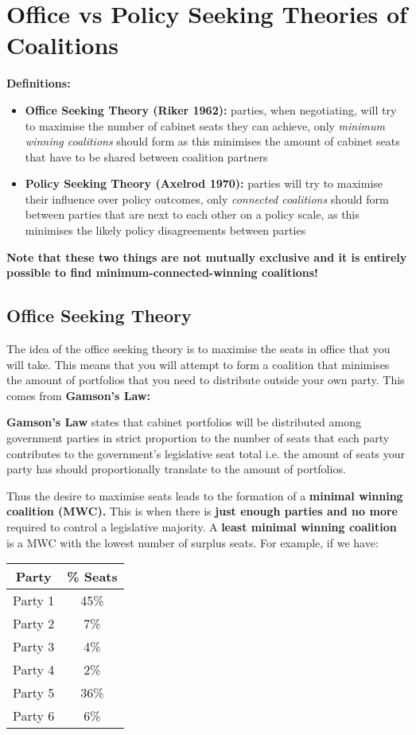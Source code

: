 \documentclass[12pt, letterpaper]{article}
\begin{document}
\section{Office vs Policy Seeking Theories of Coalitions}
\textbf{Definitions:}
\begin{itemize}
	\item \textbf{Office Seeking Theory (Riker 1962):} parties, when negotiating, will try to maximise the number of cabinet seats they can achieve, only \textit{minimum winning coalitions} should form as this minimises the amount of cabinet seats that have to be shared between coalition partners
	\item \textbf{Policy Seeking Theory (Axelrod 1970):} parties will try to maximise their influence over policy outcomes, only \textit{connected coalitions} should form between parties that are next to each other on a policy scale, as this minimises the likely policy disagreements between parties
\end{itemize}
\textbf{Note that these two things are not mutually exclusive and it is entirely possible to find minimum-connected-winning coalitions!}

\subsection{Office Seeking Theory}
The idea of the office seeking theory is to maximise the seats in office that you will take. This means that you will attempt to form a coalition that minimises the amount of portfolios that you need to distribute outside your own party. This comes from \textbf{Gamson's Law:}
\begin{center}
	\textbf{Gamson's Law} states that cabinet portfolios will be distributed among government parties in strict proportion to the number of seats that each party contributes to the government's legislative seat total i.e. the amount of seats your party has should proportionally translate to the amount of portfolios.
\end{center}
Thus the desire to maximise seats leads to the formation of a \textbf{minimal winning coalition (MWC).} This is when there is \textbf{just enough parties and no more} required to control a legislative majority. A \textbf{least minimal winning coalition} is a MWC with the lowest number of surplus seats. For example, if we have:
\begin{center}
\begin{tabular}{|c | c|}

\hline
Party & \% Seats\\
\hline
Party 1 & 45\%\\
\hline
Party 2 & 7\%\\
\hline
Party 3 & 4\%\\
\hline
Party 4 & 2\%\\
\hline
Party 5 & 36\%\\
\hline
Party 6 & 6\%\\
\hline

\end{tabular}
\end{center}
\end{document}
